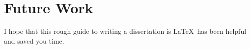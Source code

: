 \documentclass[12pt,a4paper,twoside,openright]{report}
\begin{document}
\section{Future Work}

I hope that this rough guide to writing a dissertation is \LaTeX\ has
been helpful and saved you time.




%
%
%
%
%
%
%
%
%
\end{document}
